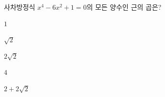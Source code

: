 사차방정식 $x^4-6x^2+1=0$의 모든 양수인 근의 곱은?
\begin{choices32}{\rule[-3ex]{0pt}{8ex}$1$}{\rule[-3ex]{0pt}{8ex}$\sqrt{2}$}{\rule[-3ex]{0pt}{8ex}$2\sqrt{2}$}{\rule[-3ex]{0pt}{8ex}$4$}{\rule[-3ex]{0pt}{8ex}$2+2\sqrt{2}$}\end{choices32}
